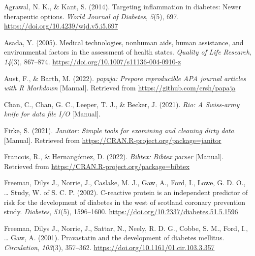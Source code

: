 \documentclass[
  man]{apa6}
\newlength{\cslhangindent}
\newlength{\cslentryspacingunit} %
\newenvironment{CSLReferences}[2] %
 {%
  \setlength{\parindent}{0pt}
  \ifodd #1
  \let\oldpar\par
  \def\par{\hangindent=\cslhangindent\oldpar}
  \fi
  \setlength{\parskip}{#2\cslentryspacingunit}
 }%
 {}
\begin{document}
\hypertarget{refs}{}
\begin{CSLReferences}{1}{0}
\leavevmode{}%
Agrawal, N. K., \& Kant, S. (2014). Targeting inflammation in diabetes: {Newer} therapeutic options. \emph{World Journal of Diabetes}, \emph{5}(5), 697. \url{https://doi.org/10.4239/wjd.v5.i5.697}

\leavevmode{}%
Asada, Y. (2005). Medical technologies, nonhuman aids, human assistance, and environmental factors in the assessment of health states. \emph{Quality of Life Research}, \emph{14}(3), 867--874. \url{https://doi.org/10.1007/s11136-004-0910-z}

\leavevmode{}%
Aust, F., \& Barth, M. (2022). \emph{{papaja}: {Prepare} reproducible {APA} journal articles with {R Markdown}} {[}Manual{]}. Retrieved from \url{https://github.com/crsh/papaja}

\leavevmode{}%
Chan, C., Chan, G. C., Leeper, T. J., \& Becker, J. (2021). \emph{Rio: {A Swiss-army} knife for data file {I}/{O}} {[}Manual{]}.

\leavevmode{}%
Firke, S. (2021). \emph{Janitor: {Simple} tools for examining and cleaning dirty data} {[}Manual{]}. Retrieved from \url{https://CRAN.R-project.org/package=janitor}

\leavevmode{}%
Francois, R., \& Hernangómez, D. (2022). \emph{Bibtex: {Bibtex} parser} {[}Manual{]}. Retrieved from \url{https://CRAN.R-project.org/package=bibtex}

\leavevmode{}%
Freeman, Dilys J., Norrie, J., Caslake, M. J., Gaw, A., Ford, I., Lowe, G. D. O., \ldots{} Study, W. of S. C. P. (2002). C-reactive protein is an independent predictor of risk for the development of diabetes in the west of scotland coronary prevention study. \emph{Diabetes}, \emph{51}(5), 1596--1600. \url{https://doi.org/10.2337/diabetes.51.5.1596}

\leavevmode{}%
Freeman, Dilys J., Norrie, J., Sattar, N., Neely, R. D. G., Cobbe, S. M., Ford, I., \ldots{} Gaw, A. (2001). Pravastatin and the development of diabetes mellitus. \emph{Circulation}, \emph{103}(3), 357--362. \url{https://doi.org/10.1161/01.cir.103.3.357}


\end{CSLReferences}
\end{document}
